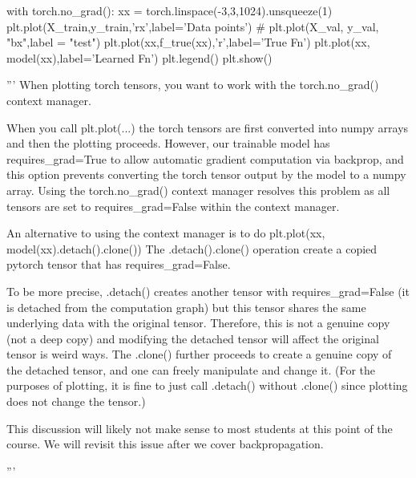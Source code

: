 \documentclass[10pt]{article}
\begin{document}
\begin{python}
    
    
    with torch.no_grad():
        xx = torch.linspace(-3,3,1024).unsqueeze(1)
        plt.plot(X_train,y_train,'rx',label='Data points')
        # plt.plot(X_val, y_val, "bx",label = "test")
        plt.plot(xx,f_true(xx),'r',label='True Fn')
        plt.plot(xx, model(xx),label='Learned Fn')
    plt.legend()
    plt.show()
    
    '''
    When plotting torch tensors, you want to work with the
    torch.no_grad() context manager.
    
    When you call plt.plot(...) the torch tensors are first converted into
    numpy arrays and then the plotting proceeds.
    However, our trainable model has requires_grad=True to allow automatic
    gradient computation via backprop, and this option prevents 
    converting the torch tensor output by the model to a numpy array.
    Using the torch.no_grad() context manager resolves this problem
    as all tensors are set to requires_grad=False within the context manager.
    
    An alternative to using the context manager is to do 
    plt.plot(xx, model(xx).detach().clone())
    The .detach().clone() operation create a copied pytorch tensor that
    has requires_grad=False.
    
    To be more precise, .detach() creates another tensor with requires_grad=False
    (it is detached from the computation graph) but this tensor shares the same
    underlying data with the original tensor. Therefore, this is not a genuine
    copy (not a deep copy) and modifying the detached tensor will affect the 
    original tensor is weird ways. The .clone() further proceeds to create a
    genuine copy of the detached tensor, and one can freely manipulate and change it.
    (For the purposes of plotting, it is fine to just call .detach() without
    .clone() since plotting does not change the tensor.)
    
    This discussion will likely not make sense to most students at this point of the course.
    We will revisit this issue after we cover backpropagation.
    
    '''
    
    \end{python}


\end{document}
